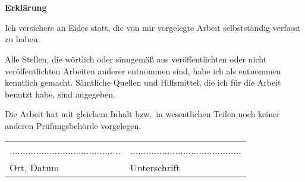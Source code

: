 \chapter*{}\label{ch:erklaerung}
\begin{center}
    \large \textbf{Erklärung}
\end{center}
Ich versichere an Eides statt, die von mir vorgelegte Arbeit selbstständig verfasst zu haben.

Alle Stellen, die wörtlich oder sinngemäß aus veröffentlichten oder nicht veröffentlichten Arbeiten anderer entnommen sind, habe ich als entnommen kenntlich gemacht.
Sämtliche Quellen und Hilfsmittel, die ich für die Arbeit benutzt habe, sind angegeben.

Die Arbeit hat mit gleichem Inhalt bzw.~in wesentlichen Teilen noch keiner anderen Prüfungsbehörde vorgelegen.

\vspace{\baselineskip*2}

\begin{tabular}{ll}
    .......................................... & .......................................... \\
    Ort, Datum                                 & Unterschrift
\end{tabular}
